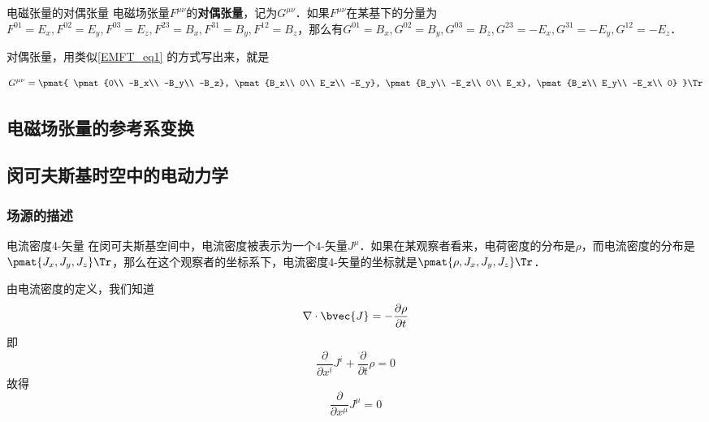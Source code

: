 \begin{definition}{电磁张量的对偶张量}
电磁场张量$F^{\mu\nu}$的\textbf{对偶张量}，记为$G^{\mu\nu}$．如果$F^{\mu\nu}$在某基下的分量为$F^{01}=E_x, F^{02}=E_y, F^{03}=E_z, F^{23}=B_x, F^{31}=B_y, F^{12}=B_z$，那么有$G^{01}=B_x, G^{02}=B_y, G^{03}=B_z, G^{23}=-E_x, G^{31}=-E_y, G^{12}=-E_z$．
\end{definition}

对偶张量，用类似\autoref{EMFT_eq1} 的方式写出来，就是

\begin{equation}
\begin{aligned}
G^{\mu\nu}=
\pmat{
\pmat{0\\ -B_x\\ -B_y\\ -B_z}, 
\pmat{B_x\\ 0\\ E_z\\ -E_y}, 
\pmat{B_y\\ -E_z\\ 0\\ E_x}, 
\pmat{B_z\\ E_y\\ -E_x\\ 0}
}\Tr
\end{aligned}
\end{equation}


\subsection{电磁场张量的参考系变换}


\subsection{闵可夫斯基时空中的电动力学}

\subsubsection{场源的描述}

\begin{definition}{电流密度4-矢量}
在闵可夫斯基空间中，电流密度被表示为一个4-矢量$J^\mu$．如果在某观察者看来，电荷密度的分布是$\rho$，而电流密度的分布是$\pmat{J_x, J_y, J_z}\Tr$，那么在这个观察者的坐标系下，电流密度4-矢量的坐标就是$\pmat{\rho, J_x, J_y, J_z}\Tr$．
\end{definition}

由电流密度的定义，我们知道
\begin{equation}
\nabla\cdot\bvec{J}=-\frac{\partial\rho}{\partial t}
\end{equation}
即
\begin{equation}
\frac{\partial}{\partial x^i}J^i+\frac{\partial}{\partial t}\rho=0
\end{equation}
故得
\begin{equation}
\frac{\partial}{\partial x^\mu}J^\mu=0
\end{equation}

